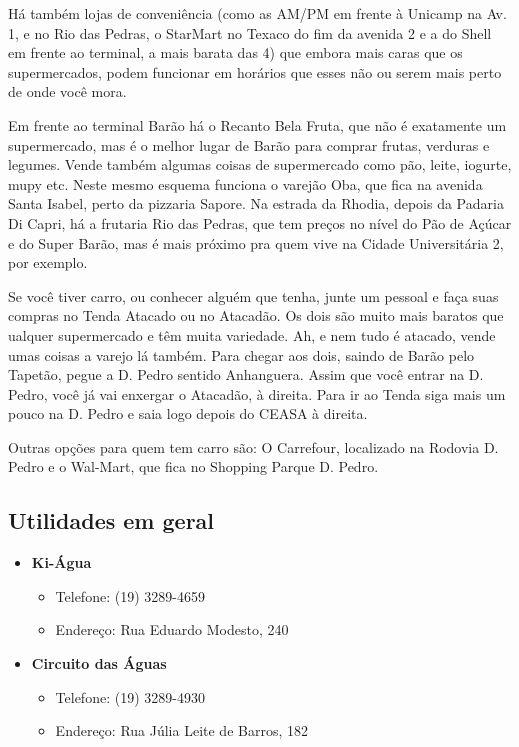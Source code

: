Há também lojas de conveniência (como as AM/PM em frente à Unicamp na Av. 1, e no Rio das
Pedras, o StarMart no Texaco do fim da avenida 2 e a do Shell em frente ao
terminal, a mais barata das 4) que embora mais caras que os supermercados, podem
funcionar em horários que esses não ou serem mais perto de onde você mora.

Em frente ao terminal Barão há o Recanto Bela Fruta, que não é exatamente um
supermercado, mas é o melhor lugar de Barão para comprar frutas, verduras
e legumes. Vende também algumas coisas de supermercado como pão, leite, iogurte,
mupy etc. Neste mesmo esquema funciona o varejão Oba, que fica na avenida Santa
Isabel, perto da pizzaria Sapore. Na estrada da Rhodia, depois da Padaria Di
Capri, há a frutaria Rio das Pedras, que tem preços no nível do Pão de Açúcar
e do Super Barão, mas é mais próximo pra quem vive na Cidade Universitária 2,
por exemplo.

Se você tiver carro, ou conhecer alguém que tenha, junte um pessoal e faça suas
compras no Tenda Atacado ou no Atacadão. Os dois são muito mais baratos que
ualquer supermercado e têm muita variedade. Ah, e nem tudo é atacado, vende umas
coisas a varejo lá também. Para chegar aos dois, saindo de Barão pelo Tapetão,
pegue a D. Pedro sentido Anhanguera. Assim que você entrar na D. Pedro, você já
vai enxergar o Atacadão, à direita. Para ir ao Tenda siga mais um pouco na D.
Pedro e saia logo depois do CEASA à direita.

Outras opções para quem tem carro são: O Carrefour, localizado na Rodovia D.
Pedro e o Wal-Mart, que fica no Shopping Parque D. Pedro.

\subsection{Utilidades em geral}

\begin{itemize}
\item  \textbf{Ki-Água}
\begin{itemize}
\item  Telefone: (19) 3289-4659
\item  Endereço: Rua Eduardo Modesto, 240
\end{itemize}
\end{itemize}

\begin{itemize}
\item  \textbf{Circuito das Águas}
\begin{itemize}
\item  Telefone: (19) 3289-4930
\item  Endereço: Rua Júlia Leite de Barros, 182
\end{itemize}
\end{itemize}

